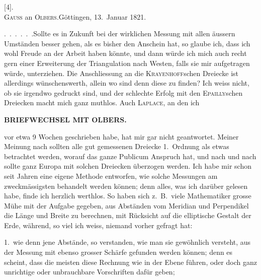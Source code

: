 \begin{center}
[4].\\
\textsc{Gauss} an \textsc{Olbers}.\quad Göttingen, 13.~Januar 1821.
\end{center}

\par\noindent\hspace*{\parindent}.\ .\ .\ .\ .\ .\quad Sollte es in Zukunft bei der wirklichen Messung mit allen äussern Umständen besser gehen, als es bisher den Anschein hat, so glaube ich, dass ich wohl Freude an der Arbeit haben könnte, und dann würde ich mich auch recht gern einer Erweiterung der Triangulation nach Westen, falls sie mir aufgetragen würde, unterziehen.
Die Anschliessung an die \textsc{Krayenhoff}schen Dreiecke ist allerdings wünschenswerth, allein wo sind denn diese zu finden?
Ich weiss nicht, ob sie irgendwo gedruckt sind, und der schlechte Erfolg mit den \textsc{Epailly}schen Dreiecken macht mich ganz muthlos.
Auch \textsc{Laplace}, an den ich
\par\clearpage
{}\hfill{\small\textbf{BRIEFWECHSEL MIT OLBERS.}}\par\medskip
\noindent vor etwa 9 Wochen geschrieben habe, hat mir gar nicht geantwortet.
Meiner Meinung nach sollten alle gut gemessenen Dreiecke 1.~Ordnung als etwas betrachtet werden, worauf das ganze Publicum Anspruch hat, und nach und nach sollte ganz Europa mit solchen Dreiecken überzogen werden.
Ich habe mir schon seit Jahren eine eigene Methode entworfen, wie solche Messungen am zweckmässigsten behandelt werden können; denn alles, was ich darüber gelesen habe, finde ich herzlich werthlos.
So haben sich z.\ B.\ viele Mathematiker grosse Mühe mit der Aufgabe gegeben, aus Abständen vom Meridian und Perpendikel die Länge und Breite zu berechnen, mit Rücksicht auf die elliptische Gestalt der Erde, während, so viel ich weiss, niemand vorher gefragt hat:

\par\noindent\hspace*{\parindent}1.\ wie denn jene Abstände, so verstanden, wie man sie gewöhnlich versteht, aus der Messung mit ebenso grosser Schärfe gefunden werden können; denn es scheint, dass die meisten diese Rechnung wie in der Ebene führen, oder doch ganz unrichtige oder unbrauchbare Vorschriften dafür geben;

